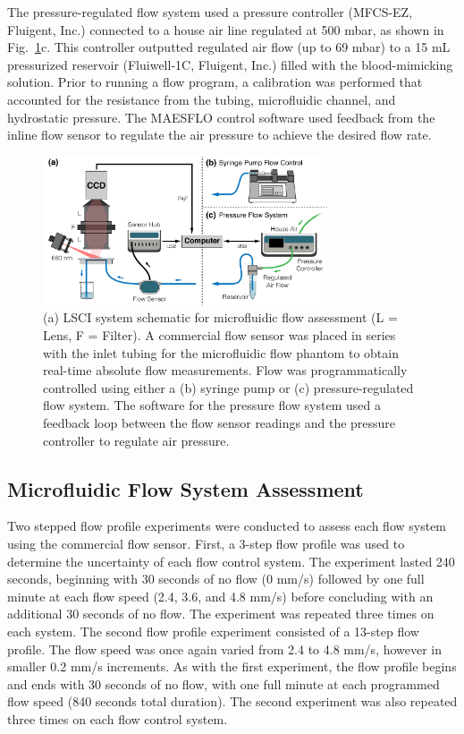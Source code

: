 \documentclass[12pt]{spieman}
\begin{document}
\begin{spacing}{2}
The pressure-regulated flow system used a pressure controller (MFCS-EZ, Fluigent, Inc.) connected to a house air line regulated at 500 mbar, as shown in Fig.~\ref{fig:system_lsci}c. This controller outputted regulated air flow (up to 69 mbar) to a 15 mL pressurized reservoir (Fluiwell-1C, Fluigent, Inc.) filled with the blood-mimicking solution. Prior to running a flow program, a calibration was performed that accounted for the resistance from the tubing, microfluidic channel, and hydrostatic pressure. The MAESFLO control software used feedback from the inline flow sensor to regulate the air pressure to achieve the desired flow rate.

\begin{figure}
    \centering
    \includegraphics[width=0.75\textwidth]{Figure2.pdf}
    \caption {
        (a) LSCI system schematic for microfluidic flow assessment (L = Lens, F = Filter). A commercial flow sensor was placed in series with the inlet tubing for the microfluidic flow phantom to obtain real-time absolute flow measurements. Flow was programmatically controlled using either a (b) syringe pump or (c) pressure-regulated flow system. The software for the pressure flow system used a feedback loop between the flow sensor readings and the pressure controller to regulate air pressure.
    }
    \label{fig:system_lsci}
\end{figure}


\subsection{Microfluidic Flow System Assessment}
\label{sect:methods_flow_assess}

Two stepped flow profile experiments were conducted to assess each flow system using the commercial flow sensor. First, a 3-step flow profile was used to determine the uncertainty of each flow control system. The experiment lasted 240 seconds, beginning with 30 seconds of no flow (0 mm/s) followed by one full minute at each flow speed (2.4, 3.6, and 4.8 mm/s) before concluding with an additional 30 seconds of no flow. The experiment was repeated three times on each system. The second flow profile experiment consisted of a 13-step flow profile. The flow speed was once again varied from 2.4 to 4.8 mm/s, however in smaller 0.2 mm/s increments. As with the first experiment, the flow profile begins and ends with 30 seconds of no flow, with one full minute at each programmed flow speed (840 seconds total duration). The second experiment was also repeated three times on each flow control system. 


\end{spacing}
\end{document}
